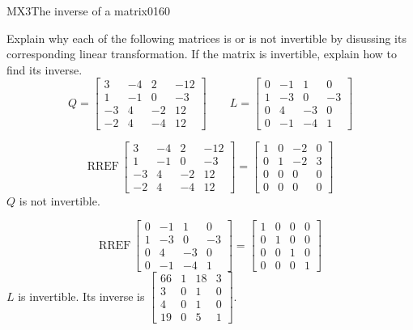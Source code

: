 


\begin{exercise}{MX3}{The inverse of a matrix}{0160} 
\begin{exerciseStatement} 

 Explain why each of the following matrices is or is not invertible by disussing its corresponding linear transformation. If the matrix is invertible, explain how to find its inverse. \[
\hspace{2em}
Q = \left[\begin{array}{cccc}
3 & -4 & 2 & -12 \\
1 & -1 & 0 & -3 \\
-3 & 4 & -2 & 12 \\
-2 & 4 & -4 & 12
\end{array}\right]
\hspace{2em}
L = \left[\begin{array}{cccc}
0 & -1 & 1 & 0 \\
1 & -3 & 0 & -3 \\
0 & 4 & -3 & 0 \\
0 & -1 & -4 & 1
\end{array}\right]
\hspace{2em}
        \] 

 \end{exerciseStatement}
 \begin{exerciseAnswer} 

 \[\mathrm{RREF}\,\left[\begin{array}{cccc}
3 & -4 & 2 & -12 \\
1 & -1 & 0 & -3 \\
-3 & 4 & -2 & 12 \\
-2 & 4 & -4 & 12
\end{array}\right]=\left[\begin{array}{cccc}
1 & 0 & -2 & 0 \\
0 & 1 & -2 & 3 \\
0 & 0 & 0 & 0 \\
0 & 0 & 0 & 0
\end{array}\right]\] \(Q\) is not invertible. 

 

 \[\mathrm{RREF}\,\left[\begin{array}{cccc}
0 & -1 & 1 & 0 \\
1 & -3 & 0 & -3 \\
0 & 4 & -3 & 0 \\
0 & -1 & -4 & 1
\end{array}\right]=\left[\begin{array}{cccc}
1 & 0 & 0 & 0 \\
0 & 1 & 0 & 0 \\
0 & 0 & 1 & 0 \\
0 & 0 & 0 & 1
\end{array}\right]\] \(L\) is invertible. Its inverse is \(\left[\begin{array}{cccc}
66 & 1 & 18 & 3 \\
3 & 0 & 1 & 0 \\
4 & 0 & 1 & 0 \\
19 & 0 & 5 & 1
\end{array}\right]\). 


\end{exerciseAnswer}
\end{exercise}
